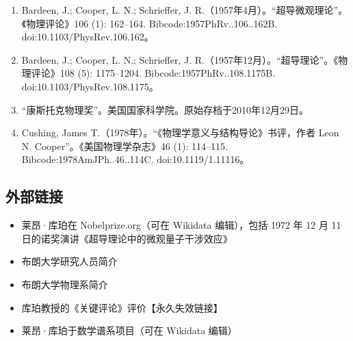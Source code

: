 \begin{enumerate}
\item Bardeen, J.; Cooper, L. N.; Schrieffer, J. R.（1957年4月）。“超导微观理论”。《物理评论》106 (1): 162–164. Bibcode:1957PhRv..106..162B. doi:10.1103/PhysRev.106.162。
\item Bardeen, J.; Cooper, L. N.; Schrieffer, J. R.（1957年12月）。“超导理论”。《物理评论》108 (5): 1175–1204. Bibcode:1957PhRv..108.1175B. doi:10.1103/PhysRev.108.1175。
\item “康斯托克物理奖”。美国国家科学院。原始存档于2010年12月29日。
\item Cushing, James T.（1978年）。“《物理学意义与结构导论》书评，作者 Leon N. Cooper”。《美国物理学杂志》46 (1): 114–115. Bibcode:1978AmJPh..46..114C. doi:10.1119/1.11116。
\end{enumerate}
\subsection{外部链接}
\begin{itemize}
\item 莱昂·库珀在 Nobelprize.org（可在 Wikidata 编辑），包括 1972 年 12 月 11 日的诺奖演讲《超导理论中的微观量子干涉效应》
\item 布朗大学研究人员简介
\item 布朗大学物理系简介
\item 库珀教授的《关键评论》评价【永久失效链接】
\item 莱昂·库珀于数学谱系项目（可在 Wikidata 编辑）
\end{itemize}